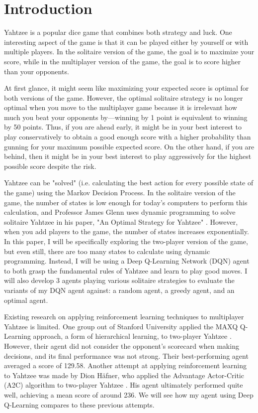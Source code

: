 \documentclass[12pt]{article}
\begin{document}
\tableofcontents

\newpage
\section{Introduction}
Yahtzee is a popular dice game that combines both strategy and luck. One interesting aspect of the game is that it can be played either by yourself or with multiple players. In the solitaire version of the game, the goal is to maximize your score, while in the multiplayer version of the game, the goal is to score higher than your opponents.

At first glance, it might seem like maximizing your expected score is optimal for both versions of the game. However, the optimal solitaire strategy is no longer optimal when you move to the multiplayer game because it is irrelevant how much you beat your opponents by—winning by 1 point is equivalent to winning by 50 points. Thus, if you are ahead early, it might be in your best interest to play conservatively to obtain a good enough score with a higher probability than gunning for your maximum possible expected score. On the other hand, if you are behind, then it might be in your best interest to play aggressively for the highest possible score despite the risk.

Yahtzee can be "solved" (i.e. calculating the best action for every possible state of the game) using the Markov Decision Process. In the solitaire version of the game, the number of states is low enough for today's computers to perform this calculation, and Professor James Glenn uses dynamic programming to solve solitaire Yahtzee in his paper, "An Optimal Strategy for Yahtzee" \cite{glenn}. However, when you add players to the game, the number of states increases exponentially. In this paper, I will be specifically exploring the two-player version of the game, but even still, there are too many states to calculate using dynamic programming. Instead, I will be using a Deep Q-Learning Network (DQN) agent to both grasp the fundamental rules of Yahtzee and learn to play good moves. I will also develop 3 agents playing various solitaire strategies to evaluate the variants of my DQN agent against: a random agent, a greedy agent, and an optimal agent.

Existing research on applying reinforcement learning techniques to multiplayer Yahtzee is limited. One group out of Stanford University applied the MAXQ Q-Learning approach, a form of hierarchical learning, to two-player Yahtzee \cite{kang}. However, their agent did not consider the opponent's scorecard when making decisions, and its final performance was not strong. Their best-performing agent averaged a score of 129.58. Another attempt at applying reinforcement learning to Yahtzee was made by Dion Häfner, who applied the Advantage Actor-Critic (A2C) algorithm to two-player Yahtzee \cite{hafner}. His agent ultimately performed quite well, achieving a mean score of around 236. We will see how my agent using Deep Q-Learning compares to these previous attempts.
\end{document}
